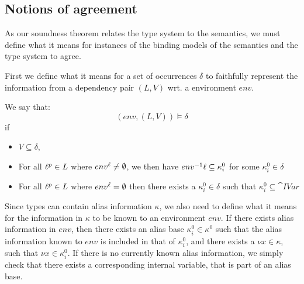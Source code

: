 \documentclass{llncs}
\begin{document}
\subsection{Notions of agreement}

As our soundness theorem relates the type system to the semantics, we
must define what it means for instances of the binding models of the
semantics and the type system to agree.

First we define what it means for a set of occurrences $\delta$ to
faithfully represent the information from a dependency pair $(L,V)$
wrt. a environment $env$.

\begin{definition}\label{def:DepAgree}
	We say that:
	$$(env,(L,V))\models\delta$$
	if
	\begin{itemize}
		\item $V\subseteq\delta$,
		\item For all $\ell^p\in L$ where
                  $env^{\ell}\neq\emptyset$, we then have $env^{-1} \ell \subseteq \kappa_i^0$ for some $\kappa_i^0\in\delta$
		\item For all $\ell^p\in L$ where $env^{\ell}=\emptyset$ then there exists a $\kappa_i^0\in\delta$ such that $\kappa_i^0\subseteq\cat{IVar}$
	\end{itemize}
      \end{definition}

      Since types can contain alias information $\kappa$, we also need
      to define what it means for the information in $\kappa$ to be
      known to an environment $env$.  If there exists alias
      information in $env$, then there exists an alias base
      $\kappa^0_i\in\kappa^0$ such that the alias information known to
      $env$ is included in that of $\kappa^0_i$, and there exists a
      $\nu x\in\kappa$, such that $\nu x\in \kappa^0_i$.  If there is
      no currently known alias information, we simply check that there
      exists a corresponding internal variable, that is part of an
      alias base.
\end{document}
